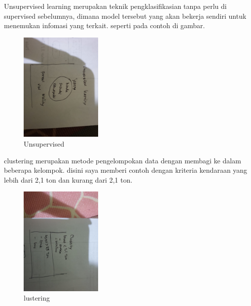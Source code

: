 \begin{enumerate}
            Unsupervised learning merupakan teknik pengklasifikasian tanpa perlu di supervised sebelumnya, dimana model tersebut yang akan bekerja sendiri untuk menemukan infomasi yang terkait. seperti pada contoh di gambar.\par
            \begin{figure}[H]
                \includegraphics[width=4cm]{figures/1174040/chapter2/unsupervised.jpeg}
                \centering
                \caption{Unsupervised}
            \end{figure}

            clustering merupakan metode pengelompokan data dengan membagi ke dalam beberapa kelompok. disini saya memberi contoh dengan kriteria kendaraan yang lebih dari 2,1 ton dan kurang dari 2,1 ton.\par
            \begin{figure}[H]
                \includegraphics[width=4cm]{figures/1174040/chapter2/cluster.jpeg}
                \centering
                \caption{lustering}
            \end{figure}


\end{enumerate}

